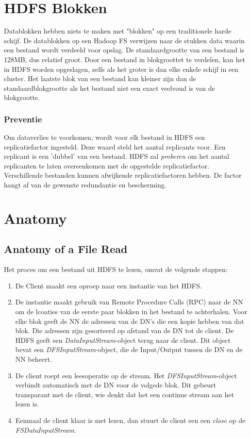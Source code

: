 \documentclass[a4paper,10pt,twoside]{report}
\begin{document}
\section{HDFS Blokken}

Datablokken hebben niets te maken met "blokken" op een traditionele harde schijf. De datablokken op een Hadoop FS verwijzen naar de stukken data waarin een bestand wordt verdeeld voor opslag. De standaardgrootte van een bestand is 128MB, dus relatief groot. Door een bestand in blokgroottet te verdelen, kan het in HDFS worden opgeslagen, zelfs als het groter is dan elke enkele schijf in een cluster. Het laatste blok van een bestand kan kleiner zijn dan de standaardblokgrootte als het bestand niet een exact veelvoud is van de blokgrootte.

\subsubsection{Preventie}

Om dataverlies te voorkomen, wordt voor elk bestand in HDFS een replicatiefactor ingesteld. Deze waard steld het aantal replicants voor. Een replicant is een 'dubbel' van een bestand. HDFS zal \textit{proberen} om het aantal replicanten te laten overeenkomen met de opgestelde replicatiefactor. Verschillende bestanden kunnen afwijkende replicatiefactoren hebben. De factor hangt af van de gewenste redundantie en bescherming.

\section{Anatomy}

\subsection{Anatomy of a File Read}

Het proces om een bestand uit HDFS te lezen, omvat de volgende stappen:

\begin{enumerate}
	\item De Client maakt een oproep naar een instantie van het HDFS.
	\item De instantie maakt gebruik van Remote Procedure Calls (RPC) naar de NN om de lcoaties van de eerste paar blokken in het bestand te achterhalen. Voor elke blok geeft de NN de adressen van de DN's die een kopie hebben van dat blok. Die adressen zijn gesorteerd op afstand van de DN tot de client. De HDFS geeft een \textit{DataInputStream}-object terug naar de client. Dit object bevat een \textit{DFSInputStream}-object, die de Input/Output tussen de DN en de NN beheert.
	\item De client roept een leesoperatie op de stream. Het \textit{DFSInputStream}-object verbindt automatisch met de DN voor de volgede blok. Dit gebeurt transparant met de client, wie denkt dat het een continue stream aan het lezen is. 
	\item Eenmaal de client klaar is met lezen, dan stuurt de client een een \textit{close} op de \textit{FSDataInputStream}.
\end{enumerate}
\end{document}
